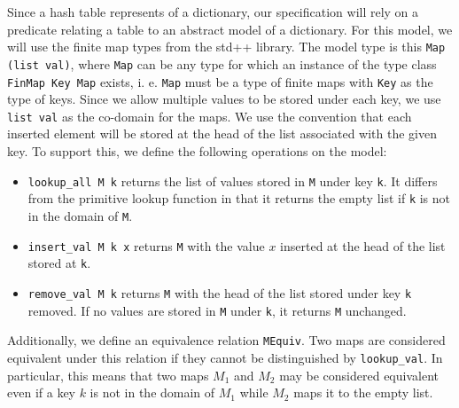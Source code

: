 \documentclass[10pt,a4paper]{article}
\begin{document}
Since a hash table represents of a dictionary, our specification will rely on a predicate relating a table to an abstract model of a dictionary. For this model, we will use the finite map types from the std++ library. The model type is this \texttt{Map (list val)}, where \texttt{Map} can be any type for which an instance of the type class \texttt{FinMap Key Map} exists, i. e. \texttt{Map} must be a type of finite maps with \texttt{Key} as the type of keys. Since we allow multiple values to be stored under each key, we use \texttt{list val} as the co-domain for the maps. We use the convention that each inserted element will be stored at the head of the list associated with the given key. To support this, we define the following operations on the model:
\begin{itemize}
\item \texttt{lookup\_all M k} returns the list of values stored in \texttt{M} under key \texttt{k}. It differs from the primitive lookup function in that it returns the empty list if \texttt{k} is not in the domain of \texttt{M}.
\item \texttt{insert\_val M k x} returns \texttt{M} with the value $x$ inserted at the head of the list stored at \texttt{k}.
\item \texttt{remove\_val M k} returns \texttt{M} with the head of the list stored under key \texttt{k} removed. If no values are stored in \texttt{M} under \texttt{k}, it returns \texttt{M} unchanged.
\end{itemize}
Additionally, we define an equivalence relation \texttt{MEquiv}. Two maps are considered equivalent under this relation if they cannot be distinguished by \texttt{lookup\_val}. In particular, this means that two maps $M_1$ and $M_2$ may be considered equivalent even if a key $k$ is not in the domain of $M_1$ while $M_2$ maps it to the empty list.
\end{document}
